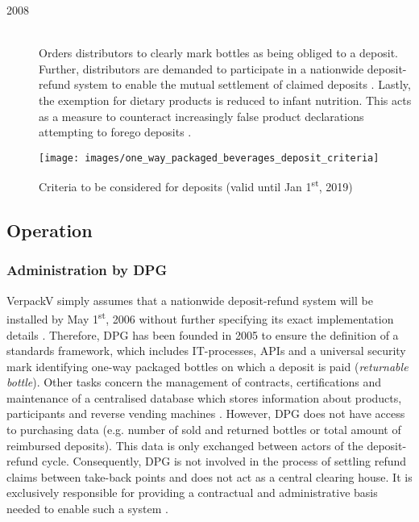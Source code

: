 \begin{description}
	\item[2008]
	\hfill \\
	Orders distributors to clearly mark bottles as being obliged to a deposit. Further, distributors are demanded to participate in a nationwide deposit-refund system to enable the mutual settlement of claimed deposits \cite[§~9]{verpackV2008}. Lastly, the exemption for dietary products is reduced to infant nutrition. This acts as a measure to counteract increasingly false product declarations attempting to forego deposits \cite[pp.~531]{verpackV2008} \cite[p.~171]{Flanderka/Stroetmann2009}.
\end{description}


\begin{figure}[hbt]
	\centering
	\texttt{[image: images/one\_way\_packaged\_beverages\_deposit\_criteria]}
	\caption{Criteria to be considered for deposits (valid until Jan 1\textsuperscript{st}, 2019) \cite[p.~9]{Hartlep2011Recycling}}
	\label{fig:depositCriteria}
\end{figure}

\FloatBarrier

\subsection{Operation}

\subsubsection{Administration by \acl{DPG}}
\ac{VerpackV} simply assumes that a nationwide deposit-refund system will be installed by May 1\textsuperscript{st}, 2006 without further specifying its exact implementation details \cite[Art.~2]{verpackV2005} \cite[§~9]{verpackV2008}. Therefore, \ac{DPG} has been founded in 2005 to ensure the definition of a standards framework, which includes IT-processes, APIs and a universal security mark identifying one-way packaged bottles on which a deposit is paid (\textit{returnable bottle}). Other tasks concern the management of contracts, certifications and maintenance of a centralised database which stores information about products, participants and reverse vending machines \cite[pp.~13]{Hartlep2011Recycling}. However, \ac{DPG} does not have access to purchasing data (e.g. number of sold and returned bottles or total amount of reimbursed deposits). This data is only exchanged between actors of the deposit-refund cycle. Consequently, \ac{DPG} is not involved in the process of settling refund claims between take-back points and does not act as a central clearing house. It is exclusively responsible for providing a contractual and administrative basis needed to enable such a system \cite[p.~14]{Hartlep2011Recycling}.

